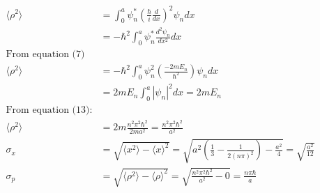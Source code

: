 \documentclass{article}
\begin{document}
\begin{align}
    \\
  \langle \rho^2 \rangle &= \int_{0}^{a} \psi^*_n \left(\frac{\hbar}{i}\frac{d}{dx}\right)^2 \psi_n dx \\
  &= -\hbar^2 \int_{0}^{a}\psi^*_n \frac{d^2\psi_n}{dx^2}dx \\
\text{From equation (7)} \\
\langle \rho^2 \rangle &= -\hbar^2 \int_{0}^{a} \psi^2_n \left(\frac{-2mE_n}{\hbar^2}\right) \psi_n dx \\
&= 2mE_n \int_{0}^{a} |\psi_n|^2dx = 2mE_n\\
\text{From equation (13)}: \\
\langle \rho^2 \rangle &= 2m\frac{n^2\pi^2\hbar^2}{2ma^2} = \frac{n^2\pi^2\hbar^2}{a^2} \\
\sigma_x &= \sqrt{\langle x^2 \rangle - \langle x \rangle^2} = \sqrt{a^2 \left(\frac{1}{3}-\frac{1}{2(n\pi)^2}\right) - \frac{a^2}{4}} = \sqrt{\frac{a^2}{12}} \\
\sigma_p &= \sqrt{\langle \rho^2 \rangle - \langle \rho \rangle^2}= \sqrt{\frac{n^2\pi^2\hbar^2}{a^2} - 0} = \frac{n\pi\hbar}{a}
\end{align}
\endgroup
\end{document}
